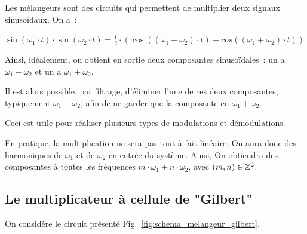 \documentclass{article}
\begin{document}
Les mélangeurs sont des circuits qui permettent de multiplier deux signaux sinusoïdaux.
On a~:
\begin{center}
$\sin(\omega_{1}\cdot t)\cdot \sin(\omega_{2}\cdot t) = \frac{1}{2}\cdot(\cos((\omega_{1} - \omega_{2})\cdot t) - cos((\omega_{1} + \omega_{2})\cdot t ) )$
\end{center}

Ainsi, idéalement, on obtient en sortie deux composantes sinusoïdales~: un a ${\omega_{1} - \omega_{2}}$ et un a ${\omega_{1} + \omega_{2}}$.

Il est alors possible, par filtrage, d'éliminer l'une de ces deux composantes, typiquement $\omega_{1} - \omega_{2}$, afin de ne garder que la composante en $\omega_{1} + \omega_{2}$.

Ceci est utile pour réaliser plusieurs types de modulations et démodulations.

En pratique, la multiplication ne sera pas tout à fait linéaire. On aura donc des harmoniques de $\omega_{1}$ et de $\omega_{2}$ en entrée du système.
Ainsi, On obtiendra des composantes à toutes les fréquences $m \cdot \omega_{1} + n \cdot \omega_{2}$, avec $(m, n) \in\mathbb{Z}^2$.


\subsection{Le multiplicateur à cellule de "Gilbert"}

On considère le circuit présenté Fig.~\ref{fig:schema_melangeur_gilbert}.
\end{document}
